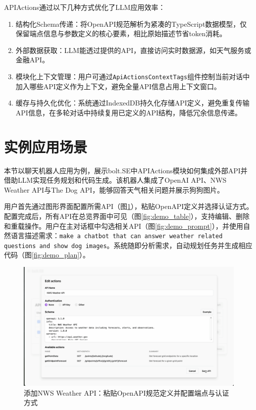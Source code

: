 APIActions通过以下几种方式优化了LLM应用效率：

\begin{enumerate}
  \item 结构化Schema传递：将OpenAPI规范解析为紧凑的TypeScript数据模型，仅保留端点信息与参数定义的核心要素，相比原始描述节省token消耗。
  
  \item 外部数据获取：LLM能透过提供的API，直接访问实时数据源，如天气服务或金融API。
  
  \item 模块化上下文管理：用户可通过\texttt{ApiActionsContextTags}组件控制当前对话中加入哪些API定义作为上下文，避免全量API信息占用上下文窗口。
  
  \item 缓存与持久化优化：系统通过IndexedDB持久化存储API定义，避免重复传输API信息，在多轮对话中持续复用已定义的API结构，降低冗余信息传递。
  \end{enumerate}

\section{实例应用场景}

本节以聊天机器人应用为例，展示bolt.SE中APIActions模块如何集成外部API并借助LLM实现任务规划和代码生成。该机器人集成了OpenAI API、NWS Weather API与The Dog API，能够回答天气相关问题并展示狗狗图片。

用户首先通过图形界面配置所需API（图\ref{fig:demo_edit}），粘贴OpenAPI定义并选择认证方式。配置完成后，所有API在总览界面中可见（图\ref{fig:demo_table}），支持编辑、删除和重载操作。用户在主对话框中勾选相关API（图\ref{fig:demo_prompt}），并使用自然语言描述需求：\texttt{make a chatbot that can answer weather related questions and show dog images}。系统随即分析需求，自动规划任务并生成相应代码（图\ref{fig:demo_plan}）。

\begin{figure}[H]
  \centering
  \includegraphics[width=\textwidth]{figures/screenshots/api-actions/demo_edit_modal.png}
  \caption{添加NWS Weather API：粘贴OpenAPI规范定义并配置端点与认证方式}
  \label{fig:demo_edit}
\end{figure}

